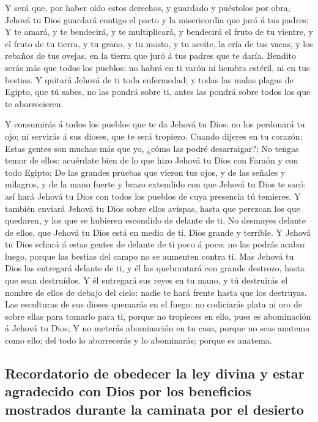  Y será que, por haber oído estos derechos, y guardado y
puéstolos por obra, Jehová tu Dios guardará contigo el pacto y la
misericordia que juró á tus padres;  Y te amará, y te
bendecirá, y te multiplicará, y bendecirá el fruto de tu vientre, y el
fruto de tu tierra, y tu grano, y tu mosto, y tu aceite, la cría de tus
vacas, y los rebaños de tus ovejas, en la tierra que juró á tus padres
que te daría.  Bendito serás más que todos los pueblos:
no habrá en ti varón ni hembra estéril, ni en tus bestias.
 Y quitará Jehová de ti toda enfermedad; y todas las
malas plagas de Egipto, que tú sabes, no las pondrá sobre ti, antes las
pondrá sobre todos los que te aborrecieren.

 Y consumirás á todos los pueblos que te da Jehová tu
Dios: no los perdonará tu ojo; ni servirás á sus dioses, que te será
tropiezo.  Cuando dijeres en tu corazón: Estas gentes son
muchas más que yo, ¿cómo las podré desarraigar?;  No
tengas temor de ellos: acuérdate bien de lo que hizo Jehová tu Dios con
Faraón y con todo Egipto;  De las grandes pruebas que
vieron tus ojos, y de las señales y milagros, y de la mano fuerte y
brazo extendido con que Jehová tu Dios te sacó: así hará Jehová tu Dios
con todos los pueblos de cuya presencia tú temieres.  Y
también enviará Jehová tu Dios sobre ellos avispas, hasta que perezcan
los que quedaren, y los que se hubieren escondido de delante de ti.
 No desmayes delante de ellos, que Jehová tu Dios está en
medio de ti, Dios grande y terrible.  Y Jehová tu Dios
echará á estas gentes de delante de ti poco á poco: no las podrás acabar
luego, porque las bestias del campo no se aumenten contra ti.
 Mas Jehová tu Dios las entregará delante de ti, y él las
quebrantará con grande destrozo, hasta que sean destruídos.
 Y él entregará sus reyes en tu mano, y tú destruirás el
nombre de ellos de debajo del cielo: nadie te hará frente hasta que los
destruyas.  Las esculturas de sus dioses quemarás en el
fuego: no codiciarás plata ni oro de sobre ellas para tomarlo para ti,
porque no tropieces en ello, pues es abominación á Jehová tu Dios;
 Y no meterás abominación en tu casa, porque no seas
anatema como ello; del todo lo aborrecerás y lo abominarás; porque es
anatema.

\hypertarget{recordatorio-de-obedecer-la-ley-divina-y-estar-agradecido-con-dios-por-los-beneficios-mostrados-durante-la-caminata-por-el-desierto}{%
\subsection{Recordatorio de obedecer la ley divina y estar agradecido
con Dios por los beneficios mostrados durante la caminata por el
desierto}\label{recordatorio-de-obedecer-la-ley-divina-y-estar-agradecido-con-dios-por-los-beneficios-mostrados-durante-la-caminata-por-el-desierto}}

